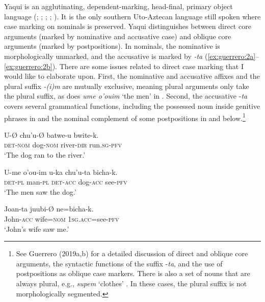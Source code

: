 \documentclass[output=paper]{langscibook}
\begin{document}
Yaqui is an agglutinating, dependent-marking, head-final, primary object language (\citealt{Lindenfeld1973}; \citealt{Escalante1990}; \citealt{DedrickCasad1999}; \citealt{Felix2000}; \citealt{Guerrero2006}). It is the only southern Uto-Aztecan language still spoken where case marking on nominals is preserved. Yaqui distinguishes between direct core arguments (marked by nominative and accusative case) and oblique core arguments (marked by postpositions). In nominals, the nominative is morphologically unmarked, and the accusative is marked by \textit{-ta} (\ref{ex:guerrero:2a}--\ref{ex:guerrero:2b}). There are some issues related to direct case marking that I would like to elaborate upon. First, the nominative and accusative affixes and the plural suffix \textit{{}-(i)m} are mutually exclusive, meaning plural arguments only take the plural suffix, as does \textit{ume o’ouim} ‘the men’ in . Second, the accusative -\textit{ta} covers several grammatical functions, including the possessed noun inside genitive phrases in  and the nominal complement of some postpositions in  and  below.\footnote{ \textrm{See Guerrero (2019a,b) for a detailed discussion of direct and oblique core arguments, the syntactic functions of the suffix -}\textrm{\textit{ta}}\textrm{, and the use of postpositions as oblique case markers. There is also a set of nouns that are always plural, e.g.,} \textrm{\textit{supem}} \textrm{‘clothes’ . In these cases, the plural suffix is not morphologically segmented.}}



\ea%
    \label{ex:guerrero:2}
 \ea
 \label{ex:guerrero:2a}
\gll U-Ø    chu’u-Ø  batwe-u  bwite-k.\\
      \textsc{det-nom}  dog\textsc{{}-nom}   river-\textsc{dir}  run.\textsc{sg-pfv}\\
\glt ‘The dog ran to the river.’

\ex
\label{ex:guerrero:2b}
\gll U-me  o’ou-im  u-ka   chu’u-ta  bicha-k.\\
\textsc{det-pl}  man-\textsc{pl}  \textsc{det-acc}  dog-\textsc{acc}  see\textsc{{}-pfv}\\
\glt ‘The men saw the dog.’

\ex
\label{ex:guerrero:2c}
\gll Joan-ta  juubi-Ø  ne=bicha-k.\\
  John-\textsc{acc}  wife=\textsc{nom}  1\textsc{sg.acc=}see-\textsc{pfv}\\
\glt ‘John’s wife saw me.’
\end{document}

